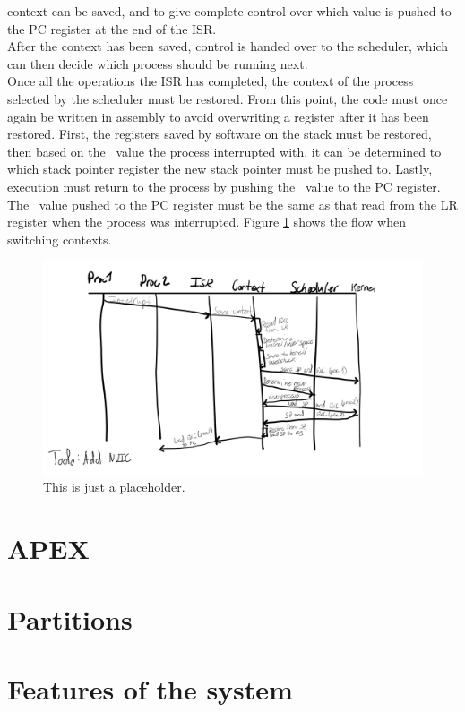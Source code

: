 context can be saved, and to give complete control over which value is pushed to
the PC register at the end of the ISR.\\
After the context has been saved, control is handed over to the scheduler, which
can then decide which process should be running next.\\
Once all the operations the ISR has completed, the context of the process
selected by the scheduler must be restored. From this point, the code must once
again be written in assembly to avoid overwriting a register after it has been 
restored. First, the registers saved by software on the stack must be restored,
then based on the \excreturn\ value the process interrupted with, it can be 
determined to which stack pointer register the new stack pointer must be pushed
to. Lastly, execution must return to the process by pushing the \excreturn\ value
to the PC register. The \excreturn\ value pushed to the PC register must be the
same as that read from the LR register when the process was interrupted.
Figure \ref{fig:flowchart_contextswitch} shows the flow when switching contexts.
\begin{figure}
    \includegraphics[width=\textwidth]{figures/flowchart_contextswitch.png}
    \caption{This is just a placeholder.}
    \label{fig:flowchart_contextswitch}
\end{figure}

\section{APEX}

\section{Partitions}

\section{Features of the system}

